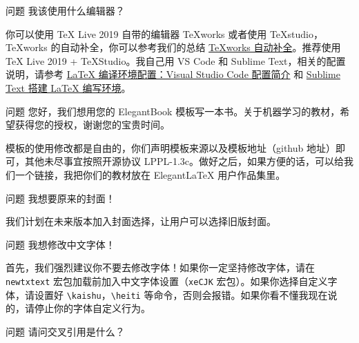 \documentclass[cn,11pt]{elegantbook}
\begin{document}
\begin{custom}{问题}
我该使用什么编辑器？
\end{custom}

\begin{solution}
你可以使用 \TeX{} Live 2019 自带的编辑器 \TeX{}works 或者使用 \TeX{}studio，\TeX works 的自动补全，你可以参考我们的总结 \href{https://github.com/EthanDeng/texworks-autocomplete}{\TeX works 自动补全}。推荐使用 \TeX{} Live 2019 + \TeX Studio。我自己用 VS Code 和 Sublime Text，相关的配置说明，请参考 \href{https://github.com/EthanDeng/vscode-latex}{\LaTeX{} 编译环境配置：Visual Studio Code 配置简介} 和 \href{https://github.com/EthanDeng/sublime-text-latex}{Sublime Text 搭建 \LaTeX{} 编写环境}。
\end{solution}


\begin{custom}{问题}
您好，我们想用您的 ElegantBook 模板写一本书。关于机器学习的教材，希望获得您的授权，谢谢您的宝贵时间。
\end{custom}

\begin{solution}
模板的使用修改都是自由的，你们声明模板来源以及模板地址（github 地址）即可，其他未尽事宜按照开源协议 LPPL-1.3c。做好之后，如果方便的话，可以给我们一个链接，我把你们的教材放在 ElegantLaTeX 用户作品集里。
\end{solution}

\begin{custom}{问题}
我想要原来的封面！
\end{custom}

\begin{solution}
我们计划在未来版本加入封面选择，让用户可以选择旧版封面。
\end{solution}

\begin{custom}{问题}
我想修改中文字体！
\end{custom}

\begin{solution}
首先，我们{\heiti 强烈建议你不要去修改字体}！如果你一定坚持修改字体，请在 \lstinline{newtxtext} 宏包加载前加入中文字体设置（\lstinline{xeCJK} 宏包）。如果你选择自定义字体，请设置好 \lstinline{\kaishu}，\lstinline{\heiti} 等命令，否则会报错。如果你看不懂我现在说的，请停止你的字体自定义行为。
\end{solution}

\begin{custom}{问题}
请问交叉引用是什么？
\end{custom}
\end{document}
